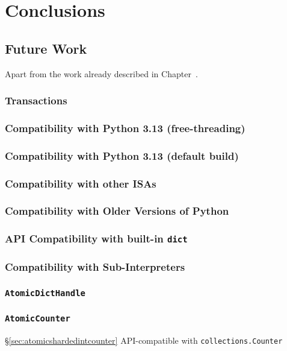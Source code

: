 \chapter{Conclusions}\label{ch:conclusions}

\section{Future Work}\label{sec:future-work}

Apart from the work already described in Chapter~\cite{ch:design-and-implementation}.

\subsection{Transactions}\label{subsec:transactions}

\subsection{Compatibility with Python 3.13 (free-threading)}\label{subsec:compatibility-with-3.13-free-threading}

\subsection{Compatibility with Python 3.13 (default build)}\label{subsec:compatibility-with-3.13-default-build}

\subsection{Compatibility with other ISAs}\label{subsec:compatibility-with-other-isas}

\subsection{Compatibility with Older Versions of Python}\label{subsec:compatibility-with-older-versions-of-python}

\subsection{API Compatibility with built-in \texttt{dict}}\label{subsec:api-compatibility-with-dict}

\subsection{Compatibility with Sub-Interpreters}\label{subsec:compatibility-with-sub-interpreters}

\subsection{\texttt{AtomicDictHandle}}\label{subsec:atomicdicthandle}

\subsection{\texttt{AtomicCounter}}\label{subsec:atomiccounter}
\S\ref{sec:atomicshardedintcounter}
API-compatible with \texttt{collections.Counter}
